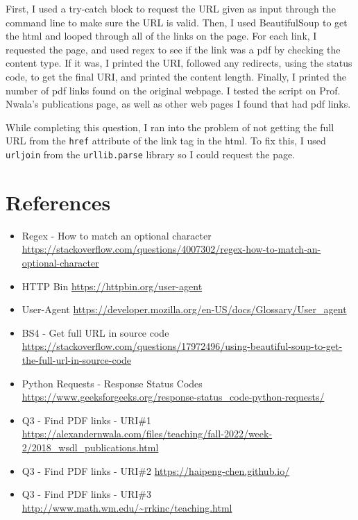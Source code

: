 \documentclass[12pt]{article}
\begin{document}
First, I used a try-catch block to request the URL given as input through the command line to make sure the URL is valid. Then, I used BeautifulSoup to get the html and looped through all of the links on the page. For each link, I requested the page, and used regex to see if the link was a pdf by checking the content type. If it was, I printed the URI, followed any redirects, using the status code, to get the final URI, and printed the content length. Finally, I printed the number of pdf links found on the original webpage. I tested the script on Prof. Nwala's publications page, as well as other web pages I found that had pdf links. 

While completing this question, I ran into the problem of not getting the full URL from the \lstinline{href} attribute of the link tag in the html. To fix this, I used \lstinline{urljoin} from the \lstinline{urllib.parse} library so I could request the page.


\section*{References}

\begin{itemize}
    \item {Regex - How to match an optional character} \url{https://stackoverflow.com/questions/4007302/regex-how-to-match-an-optional-character}
    \item {HTTP Bin} \url{https://httpbin.org/user-agent}
    \item {User-Agent} \url{https://developer.mozilla.org/en-US/docs/Glossary/User_agent}
    \item {BS4 - Get full URL in source code}
    \url{https://stackoverflow.com/questions/17972496/using-beautiful-soup-to-get-the-full-url-in-source-code}
    \item {Python Requests - Response Status Codes} \url{https://www.geeksforgeeks.org/response-status_code-python-requests/}
    \item {Q3 - Find PDF links - URI\#1} \url{https://alexandernwala.com/files/teaching/fall-2022/week-2/2018_wsdl_publications.html}
    \item{Q3 - Find PDF links - URI\#2} \url{https://haipeng-chen.github.io/}
    \item{Q3 - Find PDF links - URI\#3} \url{http://www.math.wm.edu/~rrkinc/teaching.html}
\end{itemize}
\end{document}
